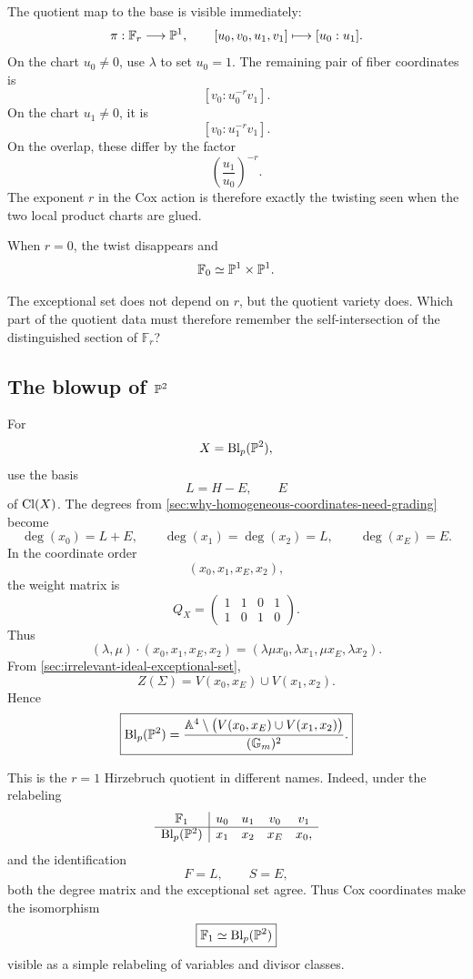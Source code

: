 The quotient map to the base is visible immediately:
\[
\pi:\mathbb F_r\longrightarrow\PP^1,
\qquad
[u_0,v_0,u_1,v_1]
\longmapsto
[u_0:u_1].
\]
On the chart \(u_0\neq0\), use \(\lambda\) to set \(u_0=1\). The
remaining pair of fiber coordinates is
\[
[v_0:u_0^{-r}v_1].
\]
On the chart \(u_1\neq0\), it is
\[
[v_0:u_1^{-r}v_1].
\]
On the overlap, these differ by the factor
\[
\left(\frac{u_1}{u_0}\right)^{-r}.
\]
The exponent \(r\) in the Cox action is therefore exactly the twisting
seen when the two local product charts are glued.

When \(r=0\), the twist disappears and
\[
\mathbb F_0\simeq\PP^1\times\PP^1.
\]

\begin{prediction}
The exceptional set does not depend on \(r\), but the quotient variety
does. Which part of the quotient data must therefore remember the
self-intersection of the distinguished section of \(\mathbb F_r\)?
\end{prediction}

\subsection{The blowup of \texorpdfstring{\(\PP^2\)}{P2}}

For
\[
X=\Blp{\PP^2}{p},
\]
use the basis
\[
L=H-E,
\qquad E
\]
of \(\Cl(X)\). The degrees from
\cref{sec:why-homogeneous-coordinates-need-grading} become
\[
\deg(x_0)=L+E,
\qquad
\deg(x_1)=\deg(x_2)=L,
\qquad
\deg(x_E)=E.
\]
In the coordinate order
\[
(x_0,x_1,x_E,x_2),
\]
the weight matrix is
\[
Q_X
=
\begin{pmatrix}
1&1&0&1\\
1&0&1&0
\end{pmatrix}.
\]
Thus
\[
(\lambda,\mu)\cdot(x_0,x_1,x_E,x_2)
=
(\lambda\mu x_0,
 \lambda x_1,
 \mu x_E,
 \lambda x_2).
\]
From \cref{sec:irrelevant-ideal-exceptional-set},
\[
Z(\Sigma)
=
V(x_0,x_E)
\cup
V(x_1,x_2).
\]
Hence
\[
\boxed{
\Blp{\PP^2}{p}
=
\frac{
\AAA^4\setminus
\bigl(V(x_0,x_E)\cup V(x_1,x_2)\bigr)
}{(\Gm)^2}.
}
\]

This is the \(r=1\) Hirzebruch quotient in different names. Indeed,
under the relabeling
\[
\begin{array}{c|cccc}
\mathbb F_1&u_0&u_1&v_0&v_1\\
\hline
\Blp{\PP^2}{p}&x_1&x_2&x_E&x_0,
\end{array}
\]
and the identification
\[
F=L,
\qquad
S=E,
\]
both the degree matrix and the exceptional set agree. Thus Cox
coordinates make the isomorphism
\[
\boxed{
\mathbb F_1\simeq\Blp{\PP^2}{p}
}
\]
visible as a simple relabeling of variables and divisor classes.

